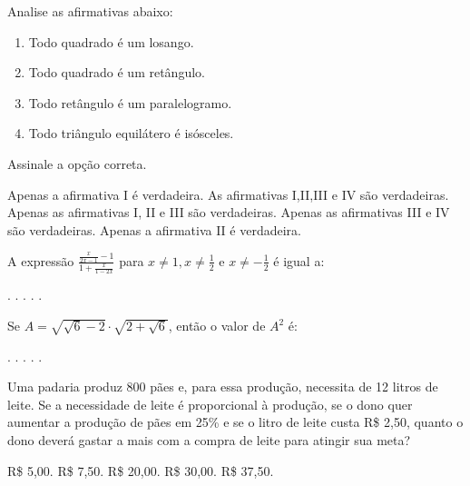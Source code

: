 \begin{question}%
Analise as afirmativas abaixo:

\begin{enumerate}[label=\Roman*.]
    \item Todo quadrado é um losango.
    \item Todo quadrado é um retângulo.
    \item Todo retângulo é um paralelogramo.
    \item Todo triângulo equilátero é isósceles.
\end{enumerate}

Assinale a opção correta.
    \begin{tasks}
        \task Apenas a afirmativa I é verdadeira.
        \task As afirmativas I,II,III e IV são verdadeiras.
        \task Apenas as afirmativas I, II e III são verdadeiras.
        \task Apenas as afirmativas III e IV são verdadeiras.
        \task Apenas a afirmativa II é verdadeira.
    \end{tasks}
\end{question}

\begin{question}%
A expressão \(\frac{\frac{x}{2x-1}-1}{1+ \frac{x}{1-2x}}\) para \(x \neq 1, x \neq \frac{1}{2}\) e \(x \neq -\frac{1}{2}\) é igual a:
    \begin{tasks}
        .
        .
        .
        .
        .
    \end{tasks}
\end{question}

\begin{question}%
Se \(A=\sqrt{\sqrt{6}-2} \cdot \sqrt{2+\sqrt{6}}\), então o valor de \(A^2\) é:
    \begin{tasks}
        .
        .
        .
        .
        .
    \end{tasks}
\end{question}

\begin{question}%
Uma padaria produz 800 pães e, para essa produção, necessita de 12 litros de leite. Se a necessidade de leite é proporcional à produção, se o dono quer aumentar a produção de pães em 25\% e se o litro de leite custa R\$ 2,50, quanto o dono deverá gastar a mais com a compra de leite para atingir sua meta?
    \begin{tasks}
        \task R\$ 5,00.
        \task R\$ 7,50.
        \task R\$ 20,00.
        \task R\$ 30,00.
        \task R\$ 37,50.
    \end{tasks}
\end{question}

